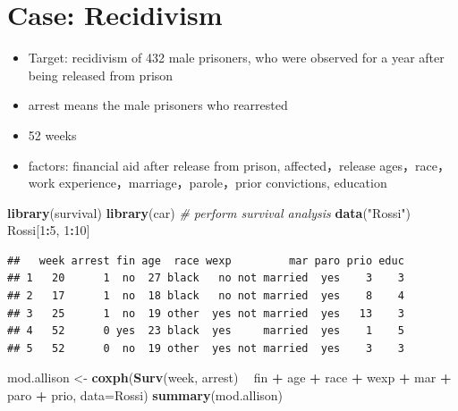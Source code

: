\documentclass[
]{book}
\newenvironment{Shaded}{\begin{snugshade}}{\end{snugshade}}
\newcommand{\CommentTok}[1]{\textcolor[rgb]{0.56,0.35,0.01}{\textit{#1}}}
\newcommand{\DataTypeTok}[1]{\textcolor[rgb]{0.13,0.29,0.53}{#1}}
\newcommand{\DecValTok}[1]{\textcolor[rgb]{0.00,0.00,0.81}{#1}}
\newcommand{\KeywordTok}[1]{\textcolor[rgb]{0.13,0.29,0.53}{\textbf{#1}}}
\newcommand{\NormalTok}[1]{#1}
\newcommand{\OperatorTok}[1]{\textcolor[rgb]{0.81,0.36,0.00}{\textbf{#1}}}
\newcommand{\StringTok}[1]{\textcolor[rgb]{0.31,0.60,0.02}{#1}}
\providecommand{\tightlist}{%
  \setlength{\itemsep}{0pt}\setlength{\parskip}{0pt}}
\begin{document}
\hypertarget{case-recidivism}{%
\section{Case: Recidivism}\label{case-recidivism}}

\begin{itemize}
\tightlist
\item
  Target: recidivism of 432 male prisoners, who were observed for a year after being released from prison
\item
  arrest means the male prisoners who rearrested
\item
  52 weeks
\item
  factors: financial aid after release from prison, affected，release ages，race，work experience，marriage，parole，prior convictions, education
\end{itemize}

\begin{Shaded}
\begin{Highlighting}[]
\KeywordTok{library}\NormalTok{(survival)}
\KeywordTok{library}\NormalTok{(car)}
\CommentTok{# perform survival analysis}
\KeywordTok{data}\NormalTok{(}\StringTok{"Rossi"}\NormalTok{)}
\NormalTok{Rossi[}\DecValTok{1}\OperatorTok{:}\DecValTok{5}\NormalTok{, }\DecValTok{1}\OperatorTok{:}\DecValTok{10}\NormalTok{]}
\end{Highlighting}
\end{Shaded}

\begin{verbatim}
##   week arrest fin age  race wexp         mar paro prio educ
## 1   20      1  no  27 black   no not married  yes    3    3
## 2   17      1  no  18 black   no not married  yes    8    4
## 3   25      1  no  19 other  yes not married  yes   13    3
## 4   52      0 yes  23 black  yes     married  yes    1    5
## 5   52      0  no  19 other  yes not married  yes    3    3
\end{verbatim}

\begin{Shaded}
\begin{Highlighting}[]
\NormalTok{mod.allison <-}\StringTok{ }\KeywordTok{coxph}\NormalTok{(}\KeywordTok{Surv}\NormalTok{(week, arrest) }\OperatorTok{~}\StringTok{ }\NormalTok{fin }\OperatorTok{+}\StringTok{ }\NormalTok{age }\OperatorTok{+}\StringTok{ }\NormalTok{race }\OperatorTok{+}\StringTok{ }\NormalTok{wexp }\OperatorTok{+}\StringTok{ }\NormalTok{mar }\OperatorTok{+}\StringTok{ }\NormalTok{paro }\OperatorTok{+}\StringTok{ }\NormalTok{prio, }\DataTypeTok{data=}\NormalTok{Rossi)}
\KeywordTok{summary}\NormalTok{(mod.allison)}
\end{Highlighting}
\end{Shaded}
\end{document}

